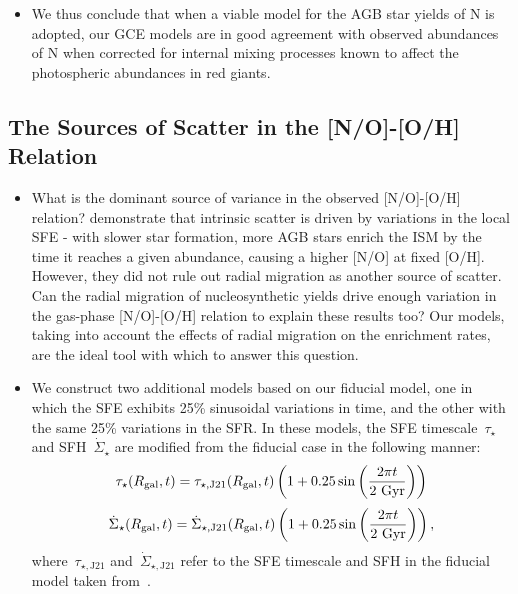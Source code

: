\documentclass[ms.tex]{subfiles}
\begin{document}
\begin{itemize}
	\item We thus conclude that when a viable model for the AGB star yields of 
	N is adopted, our GCE models are in good agreement with observed abundances 
	of N when corrected for internal mixing processes known to affect the 
	photospheric abundances in red giants. 
\end{itemize} 

\subsection{The Sources of Scatter in the [N/O]-[O/H] Relation} 
\label{sec:results:schaefer_comp} 

\begin{itemize} 
	\item What is the dominant source of variance in the observed [N/O]-[O/H] 
	relation? 
	\citet{Schaefer2020} demonstrate that intrinsic scatter is driven by 
	variations in the local SFE - with slower star formation, more AGB stars 
	enrich the ISM by the time it reaches a given abundance, causing a higher 
	[N/O] at fixed [O/H]. 
	However, they did not rule out radial migration as another source of 
	scatter. 
	Can the radial migration of nucleosynthetic yields drive enough variation 
	in the gas-phase [N/O]-[O/H] relation to explain these results too? 
	Our models, taking into account the effects of radial migration on the 
	enrichment rates, are the ideal tool with which to answer this question. 

	\item We construct two additional models based on our fiducial model, one 
	in which the SFE exhibits 25\% sinusoidal variations in time, and the other 
	with the same 25\% variations in the SFR. 
	In these models, the SFE timescale~$\tau_\star$ and SFH~$\dot{\Sigma}_\star$ 
	are modified from the fiducial case in the following manner: 
	\begin{equation} 
	\tau_\star(R_\text{gal}, t) = \tau_{\star,\text{J21}}(R_\text{gal}, t)\left(1 + 0.25\sin 
	\left(\frac{2\pi t}{2\text{ Gyr}}\right)\right)
	\end{equation} 
	\begin{equation} 
	\dot{\Sigma}_\star(R_\text{gal}, t) = \dot{\Sigma}_{\star,\text{J21}}(R_\text{gal}, t) 
	\left(1 + 0.25\sin \left(\frac{2\pi t}{2\text{ Gyr}}\right)\right), 
	\end{equation} 
	where~$\tau_{\star,\text{J21}}$ and~$\dot{\Sigma}_{\star,\text{J21}}$ refer 
	to the SFE timescale and SFH in the fiducial model taken 
	from~\citet{Johnson2021}. 


\end{itemize}
\end{document}
